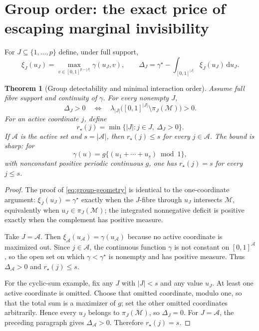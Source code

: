 \documentclass[11pt]{article}
\newtheorem{theorem}{Theorem}[section]
\theoremstyle{definition}\newtheorem{definition}[theorem]{Definition}
\newcommand{\gmax}{\gamma^\star}
\newcommand{\A}{\mathcal A}
\begin{document}
\section{Group order: the exact price of escaping marginal invisibility}

For $J\subseteq\{1,\ldots,p\}$ define, under full support,
\[
 \xi_J(u_J)=\max_{v\in[0,1]^{p-|J|}}\gamma(u_J,v),
 \qquad
 \Delta_J=\gmax-\int_{[0,1]^{|J|}}\xi_J(u_J)\,\mathrm du_J.
\]

\begin{theorem}[Group detectability and minimal interaction order]
\label{thm:group-order}
Assume full fibre support and continuity of $\gamma$.  For every nonempty
$J$,
\begin{equation}
 \Delta_J>0
 \quad\Longleftrightarrow\quad
 \lambda_{|J|}\bigl([0,1]^{|J|}\setminus\pi_J(\mathcal M)\bigr)>0.
 \label{eq:group-geometry}
\end{equation}
For an active coordinate $j$, define
\[
 r_\star(j)=\min\bigl\{|J|:j\in J,\ \Delta_J>0\bigr\}.
\]
If $\A$ is the active set and $s=|\A|$, then $r_\star(j)\le s$ for every
$j\in\A$.  The bound is sharp: for
\[
 \gamma(u)=g\{(u_1+\cdots+u_s)\bmod1\},
\]
with nonconstant positive periodic continuous $g$, one has
$r_\star(j)=s$ for every $j\le s$.
\end{theorem}

\begin{proof}
The proof of \eqref{eq:group-geometry} is identical to the one-coordinate
argument: $\xi_J(u_J)=\gmax$ exactly when the $J$-fibre through $u_J$
intersects $\mathcal M$, equivalently when $u_J\in\pi_J(\mathcal M)$; the
integrated nonnegative deficit is positive exactly when the complement has
positive measure.

Take $J=\A$.  Then $\xi_\A(u_\A)=\gamma(u_\A)$ because no active coordinate
is maximized out.  Since $j\in\A$, the continuous function $\gamma$ is not
constant on $[0,1]^\A$, so the open set on which
$\gamma<\gmax$ is nonempty and has positive measure.  Thus
$\Delta_\A>0$ and $r_\star(j)\le s$.

For the cyclic-sum example, fix any $J$ with $|J|<s$ and any value $u_J$.
At least one active coordinate is omitted.  Choose that omitted coordinate,
modulo one, so that the total sum is a maximizer of $g$; set the other omitted
coordinates arbitrarily.  Hence every $u_J$ belongs to
$\pi_J(\mathcal M)$, so $\Delta_J=0$.  For $J=\A$, the preceding paragraph
gives $\Delta_\A>0$.  Therefore $r_\star(j)=s$.
\end{proof}
\end{document}

